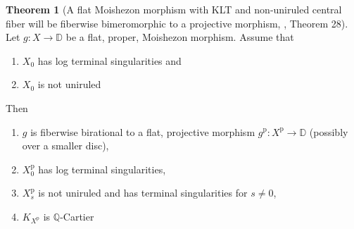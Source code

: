 \documentclass[11pt]{article}
\theoremstyle{definition}
\newtheorem{theorem}{Theorem}
\begin{document}
	\begin{theorem}[A flat Moishezon morphism with KLT and non-uniruled central fiber will be fiberwise bimeromorphic to a projective morphism, \cite{Moishezonmorphism}, Theorem 28]
	Let $g: X \rightarrow \mathbb{D}$ be a flat, proper, Moishezon morphism. Assume that
	\begin{enumerate}
		\item $X_0$ has log terminal singularities and
		\item $X_0$ is not uniruled
	\end{enumerate}
	Then
	\begin{enumerate}
		\item[(a)] $g$ is fiberwise birational to a flat, projective morphism $g^{\mathrm{p}}: X^{\mathrm{p}} \rightarrow \mathbb{D}$ (possibly over a smaller disc),
		\item[(b)] $X_0^{\mathrm{p}}$ has log terminal singularities,
		\item[(c)] $X_s^{\mathrm{p}}$ is not uniruled and has terminal singularities for $s \neq 0$,
		\item[(d)] $K_{X^{\mathrm{p}}}$ is $\mathbb{Q}$-Cartier
	\end{enumerate}
	\end{theorem}
\end{document}
